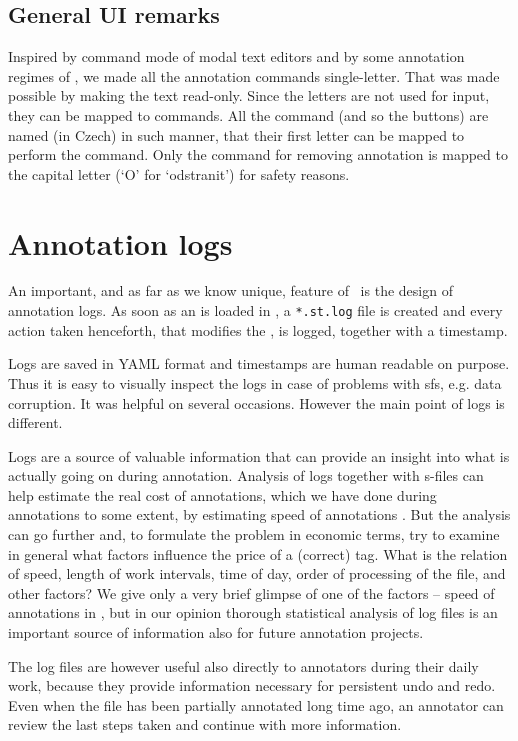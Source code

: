 \subsection{General UI remarks}
Inspired by command mode of modal text editors and by some annotation regimes of \tred, we made all the annotation commands single-letter. That was made possible by making the text read-only. Since the letters are not used for input, they can be mapped to commands. All the command (and so the buttons) are named (in Czech) in such manner, that their first letter can be mapped to perform the command. Only the command for removing annotation is mapped to the capital letter (`O' for `odstranit') for safety reasons.


\section{Annotation logs}
\label{sec:logs}
An important, and as far as we know unique, feature of \seman\ is the design of annotation logs. As soon as an \sf is loaded in \seman, a \verb=*.st.log= file is created and every action taken henceforth, that modifies the \sf, is logged, together with a timestamp. 

Logs are saved in YAML format and timestamps are human readable on purpose. Thus it is easy to visually inspect the logs in case of problems with sf{}s, e.g. data corruption. It was helpful on several occasions. However the main point of logs is different.

Logs are a source of valuable information that can provide an insight into what is actually going on during annotation. Analysis of logs together with s-files can help estimate the real cost of annotations, which we have done during annotations to some extent, by estimating speed of annotations . 
But the analysis can go further and, to formulate the problem in economic terms, try to examine in general what factors influence the price of a (correct) tag. What is the relation of speed, length of work intervals, time of day, order of processing of the file, and other factors? We give only a very brief glimpse of one of the factors -- speed of annotations in , but in our opinion thorough statistical analysis of log files is an important source of information also for future annotation projects. 

The log files are however useful also directly to annotators during their daily work, because they provide information necessary for persistent undo and redo. Even when the file has been partially annotated long time ago, an annotator can review the last steps taken and continue with more information.
